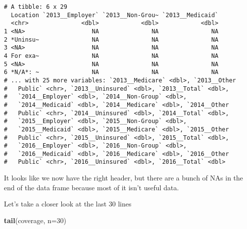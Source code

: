 \documentclass[]{article}
\newenvironment{Shaded}{\begin{snugshade}}{\end{snugshade}}
\newcommand{\DataTypeTok}[1]{\textcolor[rgb]{0.13,0.29,0.53}{#1}}
\newcommand{\DecValTok}[1]{\textcolor[rgb]{0.00,0.00,0.81}{#1}}
\newcommand{\KeywordTok}[1]{\textcolor[rgb]{0.13,0.29,0.53}{\textbf{#1}}}
\newcommand{\NormalTok}[1]{#1}
\begin{document}
\begin{verbatim}
# A tibble: 6 x 29
  Location `2013__Employer` `2013__Non-Grou~ `2013__Medicaid`
  <chr>               <dbl>            <dbl>            <dbl>
1 <NA>                   NA               NA               NA
2 *Uninsu~               NA               NA               NA
3 <NA>                   NA               NA               NA
4 For exa~               NA               NA               NA
5 <NA>                   NA               NA               NA
6 *N/A*: ~               NA               NA               NA
# ... with 25 more variables: `2013__Medicare` <dbl>, `2013__Other
#   Public` <chr>, `2013__Uninsured` <dbl>, `2013__Total` <dbl>,
#   `2014__Employer` <dbl>, `2014__Non-Group` <dbl>,
#   `2014__Medicaid` <dbl>, `2014__Medicare` <dbl>, `2014__Other
#   Public` <chr>, `2014__Uninsured` <dbl>, `2014__Total` <dbl>,
#   `2015__Employer` <dbl>, `2015__Non-Group` <dbl>,
#   `2015__Medicaid` <dbl>, `2015__Medicare` <dbl>, `2015__Other
#   Public` <chr>, `2015__Uninsured` <dbl>, `2015__Total` <dbl>,
#   `2016__Employer` <dbl>, `2016__Non-Group` <dbl>,
#   `2016__Medicaid` <dbl>, `2016__Medicare` <dbl>, `2016__Other
#   Public` <chr>, `2016__Uninsured` <dbl>, `2016__Total` <dbl>
\end{verbatim}

It looks like we now have the right header, but there are a bunch of NAs
in the end of the data frame because most of it isn't useful data.

Let's take a closer look at the last 30 lines

\begin{Shaded}
\begin{Highlighting}[]
\KeywordTok{tail}\NormalTok{(coverage, }\DataTypeTok{n=}\DecValTok{30}\NormalTok{)}
\end{Highlighting}
\end{Shaded}
\end{document}
